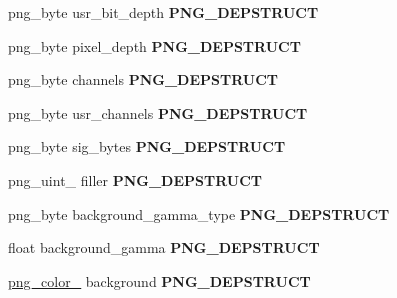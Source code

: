 \begin{DoxyCompactItemize}
\item 
\hypertarget{structpng__struct__def_a72a5ef22fad2dc4c49b30ea2fda9117b}{png\-\_\-byte usr\-\_\-bit\-\_\-depth {\bfseries P\-N\-G\-\_\-\-D\-E\-P\-S\-T\-R\-U\-C\-T}}\label{structpng__struct__def_a72a5ef22fad2dc4c49b30ea2fda9117b}

\item 
\hypertarget{structpng__struct__def_a7ac9ab7966f50520d6121fb05192e5f1}{png\-\_\-byte pixel\-\_\-depth {\bfseries P\-N\-G\-\_\-\-D\-E\-P\-S\-T\-R\-U\-C\-T}}\label{structpng__struct__def_a7ac9ab7966f50520d6121fb05192e5f1}

\item 
\hypertarget{structpng__struct__def_a807c752a899c92707291bfcce6fab2df}{png\-\_\-byte channels {\bfseries P\-N\-G\-\_\-\-D\-E\-P\-S\-T\-R\-U\-C\-T}}\label{structpng__struct__def_a807c752a899c92707291bfcce6fab2df}

\item 
\hypertarget{structpng__struct__def_a0cb85de11b2abe13aa815c1114f282af}{png\-\_\-byte usr\-\_\-channels {\bfseries P\-N\-G\-\_\-\-D\-E\-P\-S\-T\-R\-U\-C\-T}}\label{structpng__struct__def_a0cb85de11b2abe13aa815c1114f282af}

\item 
\hypertarget{structpng__struct__def_a3fd69c408bf417046e7908ecc1fd72a7}{png\-\_\-byte sig\-\_\-bytes {\bfseries P\-N\-G\-\_\-\-D\-E\-P\-S\-T\-R\-U\-C\-T}}\label{structpng__struct__def_a3fd69c408bf417046e7908ecc1fd72a7}

\item 
\hypertarget{structpng__struct__def_aab43d6c3aa8db1823706837f7fcea71a}{png\-\_\-uint\-\_ filler {\bfseries P\-N\-G\-\_\-\-D\-E\-P\-S\-T\-R\-U\-C\-T}}\label{structpng__struct__def_aab43d6c3aa8db1823706837f7fcea71a}

\item 
\hypertarget{structpng__struct__def_a0b9e17544ec386196469cb1e73eaad05}{png\-\_\-byte background\-\_\-gamma\-\_\-type {\bfseries P\-N\-G\-\_\-\-D\-E\-P\-S\-T\-R\-U\-C\-T}}\label{structpng__struct__def_a0b9e17544ec386196469cb1e73eaad05}

\item 
\hypertarget{structpng__struct__def_a3c507b6616921e5081809b910fb3fd85}{float background\-\_\-gamma {\bfseries P\-N\-G\-\_\-\-D\-E\-P\-S\-T\-R\-U\-C\-T}}\label{structpng__struct__def_a3c507b6616921e5081809b910fb3fd85}

\item 
\hypertarget{structpng__struct__def_a0530c83b81049b5a96506f9607eaa13a}{\hyperlink{structpng__color__16__struct}{png\-\_\-color\-\_} background {\bfseries P\-N\-G\-\_\-\-D\-E\-P\-S\-T\-R\-U\-C\-T}}\label{structpng__struct__def_a0530c83b81049b5a96506f9607eaa13a}


\end{DoxyCompactItemize}
